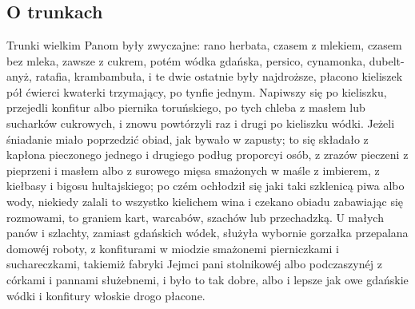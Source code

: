 \documentclass{book}
\begin{document}
\setcounter{chapter}{9}
\chapter{}
\section{O trunkach}
Trunki wielkim Panom były zwyczajne: rano herbata, czasem z mlekiem, czasem bez mleka, zawsze z cukrem, potém wódka gdańska, persico, cynamonka, dubelt-anyż, ratafia, krambambuła, i te dwie ostatnie były najdroższe, płacono kieliszek pół ćwierci kwaterki trzymający, po tynfie jednym. Napiwszy się po kieliszku, przejedli konfitur albo piernika toruńskiego, po tych chleba z masłem lub sucharków cukrowych, i znowu powtórzyli raz i drugi po kieliszku wódki. Jeżeli śniadanie miało poprzedzić obiad, jak bywało w zapusty; to się składało z kapłona pieczonego jednego i drugiego podług proporcyi osób, z zrazów pieczeni z pieprzeni i masłem albo z surowego mięsa smażonych w maśle z imbierem, z kiełbasy i bigosu hultajskiego; po czém ochłodził się jaki taki szklenicą piwa albo wody, niekiedy zalali to wszystko kielichem wina i czekano obiadu zabawiając się rozmowami, to graniem kart, warcabów, szachów lub przechadzką. U małych panów i szlachty, zamiast gdańskich wódek, służyła wybornie gorzałka przepalana domowéj roboty, z konfiturami w miodzie smażonemi pierniczkami i suchareczkami, takiemiż fabryki Jejmci pani stolnikowéj albo podczaszynéj z córkami i pannami służebnemi, i było to tak dobre, albo i lepsze jak owe gdańskie wódki i konfitury włoskie drogo płacone.
\end{document}
